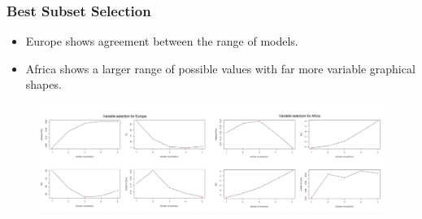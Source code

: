 \documentclass{beamer}
\begin{document}
% 
% 
% 
% 
% 
% 
% 
% 
% 
\begin{frame}
  \frametitle{Best Subset Selection}
  \begin{itemize}
    \item Europe shows agreement between the range of models.
    \item Africa shows a larger range of possible values with far more variable graphical shapes.
  \end{itemize}
  \begin{figure}
    \includegraphics[width=\textwidth]{img/Best Subset Selection.png}
  \end{figure}
\end{frame}
% 
% 
% 
% 
\end{document}
